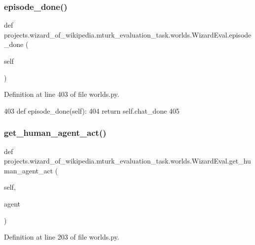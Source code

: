\subsubsection{\texorpdfstring{episode\+\_\+done()}{episode\_done()}}
{\footnotesize\ttfamily def projects.\+wizard\+\_\+of\+\_\+wikipedia.\+mturk\+\_\+evaluation\+\_\+task.\+worlds.\+Wizard\+Eval.\+episode\+\_\+done (\begin{DoxyParamCaption}\item[{}]{self }\end{DoxyParamCaption})}



Definition at line 403 of file worlds.\+py.


\begin{DoxyCode}
403     \textcolor{keyword}{def }episode\_done(self):
404         \textcolor{keywordflow}{return} self.chat\_done
405 
\end{DoxyCode}
\mbox{\label{classprojects_1_1wizard__of__wikipedia_1_1mturk__evaluation__task_1_1worlds_1_1WizardEval_abc7bd5ac461df6eaf0e591888aaf68b9}} 
\subsubsection{\texorpdfstring{get\+\_\+human\+\_\+agent\+\_\+act()}{get\_human\_agent\_act()}}
{\footnotesize\ttfamily def projects.\+wizard\+\_\+of\+\_\+wikipedia.\+mturk\+\_\+evaluation\+\_\+task.\+worlds.\+Wizard\+Eval.\+get\+\_\+human\+\_\+agent\+\_\+act (\begin{DoxyParamCaption}\item[{}]{self,  }\item[{}]{agent }\end{DoxyParamCaption})}



Definition at line 203 of file worlds.\+py.


